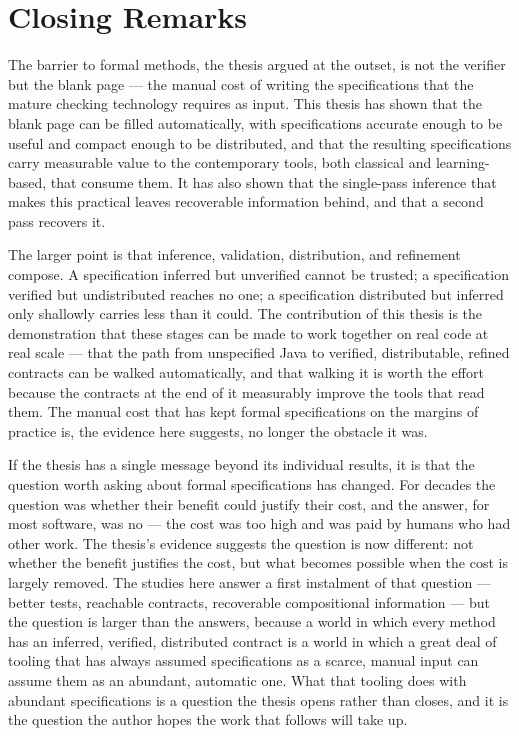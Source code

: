 \section{Closing Remarks}

The barrier to formal methods, the thesis argued at the outset, is not the
verifier but the blank page --- the manual cost of writing the specifications
that the mature checking technology requires as input. This thesis has shown that
the blank page can be filled automatically, with specifications accurate enough
to be useful and compact enough to be distributed, and that the resulting
specifications carry measurable value to the contemporary tools, both classical
and learning-based, that consume them. It has also shown that the single-pass
inference that makes this practical leaves recoverable information behind, and
that a second pass recovers it.

The larger point is that inference, validation, distribution, and refinement
compose. A specification inferred but unverified cannot be trusted; a
specification verified but undistributed reaches no one; a specification
distributed but inferred only shallowly carries less than it could. The
contribution of this thesis is the demonstration that these stages can be made to
work together on real code at real scale --- that the path from unspecified Java
to verified, distributable, refined contracts can be walked automatically, and
that walking it is worth the effort because the contracts at the end of it
measurably improve the tools that read them. The manual cost that has kept formal
specifications on the margins of practice is, the evidence here suggests, no
longer the obstacle it was.

If the thesis has a single message beyond its individual results, it is that the
question worth asking about formal specifications has changed. For decades the
question was whether their benefit could justify their cost, and the answer, for
most software, was no --- the cost was too high and was paid by humans who had
other work. The thesis's evidence suggests the question is now different: not
whether the benefit justifies the cost, but what becomes possible when the cost is
largely removed. The studies here answer a first instalment of that question ---
better tests, reachable contracts, recoverable compositional information --- but
the question is larger than the answers, because a world in which every method has
an inferred, verified, distributed contract is a world in which a great deal of
tooling that has always assumed specifications as a scarce, manual input can assume
them as an abundant, automatic one. What that tooling does with abundant
specifications is a question the thesis opens rather than closes, and it is the
question the author hopes the work that follows will take up.

